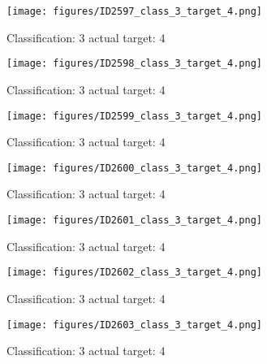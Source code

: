 \begin{figure}[h!]
\begin{center}
\texttt{[image: figures/ID2597\_class\_3\_target\_4.png]}
\end{center}
\caption{ Classification: 3 actual target: 4}
\label{fig:ID2597_class_3_target_4}
\end{figure}
\begin{figure}[h!]
\begin{center}
\texttt{[image: figures/ID2598\_class\_3\_target\_4.png]}
\end{center}
\caption{ Classification: 3 actual target: 4}
\label{fig:ID2598_class_3_target_4}
\end{figure}
\begin{figure}[h!]
\begin{center}
\texttt{[image: figures/ID2599\_class\_3\_target\_4.png]}
\end{center}
\caption{ Classification: 3 actual target: 4}
\label{fig:ID2599_class_3_target_4}
\end{figure}
\begin{figure}[h!]
\begin{center}
\texttt{[image: figures/ID2600\_class\_3\_target\_4.png]}
\end{center}
\caption{ Classification: 3 actual target: 4}
\label{fig:ID2600_class_3_target_4}
\end{figure}
\begin{figure}[h!]
\begin{center}
\texttt{[image: figures/ID2601\_class\_3\_target\_4.png]}
\end{center}
\caption{ Classification: 3 actual target: 4}
\label{fig:ID2601_class_3_target_4}
\end{figure}
\begin{figure}[h!]
\begin{center}
\texttt{[image: figures/ID2602\_class\_3\_target\_4.png]}
\end{center}
\caption{ Classification: 3 actual target: 4}
\label{fig:ID2602_class_3_target_4}
\end{figure}
\begin{figure}[h!]
\begin{center}
\texttt{[image: figures/ID2603\_class\_3\_target\_4.png]}
\end{center}
\caption{ Classification: 3 actual target: 4}
\label{fig:ID2603_class_3_target_4}
\end{figure}
